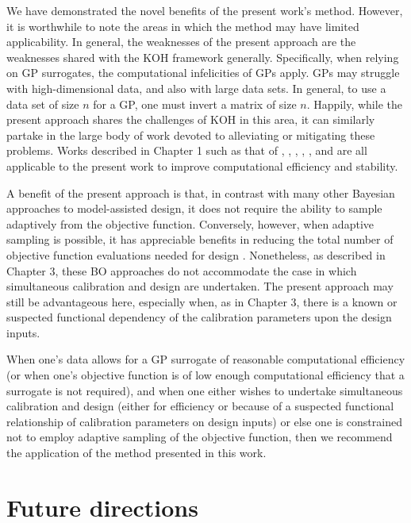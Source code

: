 \documentclass[10pt,a4paper]{article}
\begin{document}
We have demonstrated the novel benefits of the present work's method.
However, it is worthwhile to note the areas in which the method may have limited applicability.
In general, the weaknesses of the present approach are the weaknesses shared with the KOH framework generally.
Specifically, when relying on GP surrogates, the computational infelicities of GPs apply.
GPs may struggle with high-dimensional data, and also with large data sets.
In general, to use a data set of size $n$ for a GP, one must invert a matrix of size $n$.
Happily, while the present approach shares the challenges of KOH in this area, it can similarly partake in the large body of work devoted to alleviating or mitigating these problems.
Works described in Chapter 1 such as that of  \citet{Higdon2008a}, \citet{Bhat2010}, \citet{Paulo2012}, \citet{Drignei2012}, \citet{Pratola2013}, and \citet{Higdon2013} are all applicable to the present work to improve computational efficiency and stability.

A benefit of the present approach is that, in contrast with many other Bayesian approaches to model-assisted design, it does not require the ability to sample adaptively from the objective function.
Conversely, however, when adaptive sampling is possible, it has appreciable benefits in reducing the total number of objective function evaluations needed for design \citep{Jones1998,Vazquez2009,Bect2012,Chevalier2014}.
Nonetheless, as described in Chapter 3, these BO approaches do not accommodate the case in which simultaneous calibration and design are undertaken.
The present approach may still be advantageous here, especially when, as in Chapter 3, there is a known or suspected functional dependency of the calibration parameters upon the design inputs.

When one's data allows for a GP surrogate of reasonable computational efficiency (or when one's objective function is of low enough computational efficiency that a surrogate is not required), and when one either wishes to undertake simultaneous calibration and design (either for efficiency or because of a suspected functional relationship of calibration parameters on design inputs) or else one is constrained not to employ adaptive sampling of the objective function, then we recommend the application of the method presented in this work.

\section{Future directions}
\end{document}
